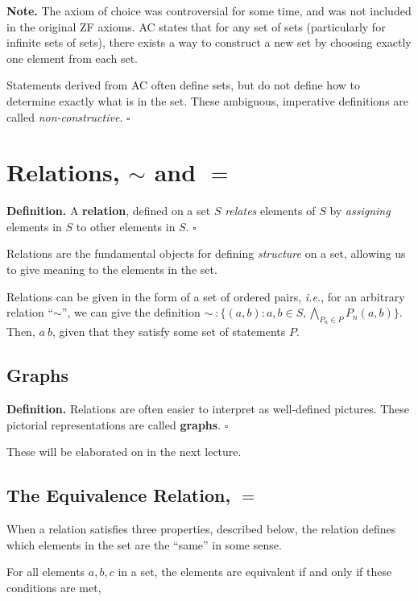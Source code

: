 \documentclass[letterpaper,twoside]{article}
\def\SmallHSpace{\hspace*{1mm}}
\newcommand\Ie[1]{\textit{i.e.}, #1}
\newcommand{\DefinedTerm}[1]{\textbf{#1}}
\newcommand{\Definition}[1]{%
    \emoji{book} \textbf{Definition.}\SmallHSpace #1 \hfill $\square$
}
\newcommand{\Note}[1]{%
    \emoji{warning} \textbf{Note.}\SmallHSpace #1 \hfill $\square$
}
\begin{document}
\begin{multicols}{2}

\Note
{
    The axiom of choice was controversial for some time, and was not included in the original ZF axioms.
    AC states that for any set of sets (particularly for infinite sets of sets), there exists a way to construct a new set by choosing exactly one element from each set.

    Statements derived from AC often define sets, but do not define how to determine exactly what is in the set.
    These ambiguous, imperative definitions are called \textit{non-constructive}.
}

\section{Relations, $\sim$ and $=$}

\Definition
{
    A \DefinedTerm{relation}, defined on a set $S$ \textit{relates} elements of $S$ by \textit{assigning} elements in $S$ to other elements in $S$.
}

Relations are the fundamental objects for defining \textit{structure} on a set, allowing us to give meaning to the elements in the set.

Relations can be given in the form of a set of ordered pairs, \Ie{for an arbitrary relation ``$\sim$'', we can give the definition $\sim \ : \{(a,b) : a,b \in S, \bigwedge\limits_{P_n \in P} P_n(a,b) \}$}.
Then, $a ~ b$, given that they satisfy some set of statements $P$.

\subsection{Graphs}

\Definition
{
    Relations are often easier to interpret as well-defined pictures.
    These pictorial representations are called \DefinedTerm{graphs}.
}

These will be elaborated on in the next lecture.

\subsection{The Equivalence Relation, $=$}

When a relation satisfies three properties, described below, the relation defines which elements in the set are the ``same'' in some sense.

For all elements $a,b,c$ in a set, the elements are equivalent if and only if these conditions are met,

\end{multicols}
\end{document}
